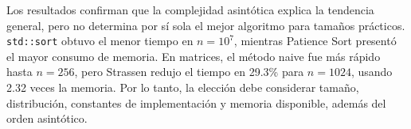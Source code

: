 Los resultados confirman que la complejidad asintótica explica la tendencia
general, pero no determina por sí sola el mejor algoritmo para tamaños
prácticos. \texttt{std::sort} obtuvo el menor tiempo en $n=10^7$, mientras
Patience Sort presentó el mayor consumo de memoria. En matrices, el método
naive fue más rápido hasta $n=256$, pero Strassen redujo el tiempo en 29.3\%
para $n=1024$, usando 2.32 veces la memoria. Por lo tanto, la elección debe
considerar tamaño, distribución, constantes de implementación y memoria
disponible, además del orden asintótico.

